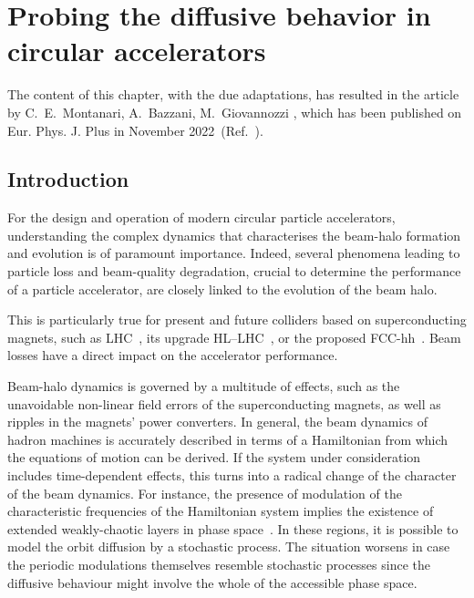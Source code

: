 \chapter{Probing the diffusive behavior in circular accelerators}

\noindent\textsf{The content of this chapter, with the due adaptations, has resulted in the article by C.\ E.\ Montanari, A.\ Bazzani, M.\ Giovannozzi \textit{}, which has been published on Eur. Phys. J. Plus in November 2022~(Ref.~\cite{our_paper9}).}


\section{Introduction}
\label{sec:introduction}


For the design and operation of modern circular particle accelerators, understanding the complex dynamics that characterises the beam-halo formation and evolution is of paramount importance. Indeed, several phenomena leading to particle loss and beam-quality degradation, crucial to determine the performance of a particle accelerator, are closely linked to the evolution of the beam halo. 

This is particularly true for present and future colliders based on superconducting magnets, such as LHC~\cite{LHCDR}, its upgrade HL--LHC~\cite{BejarAlonso:2749422}, or the proposed FCC-hh~\cite{FCC-hhCDR}. Beam losses have a direct impact on the accelerator performance. 

Beam-halo dynamics is governed by a multitude of effects, such as the unavoidable non-linear field errors of the superconducting magnets, as well as ripples in the magnets' power converters. In general, the beam dynamics of hadron machines is accurately described in terms of a Hamiltonian from which the equations of motion can be derived. If the system under consideration includes time-dependent effects, this turns into a radical change of the character of the beam dynamics. For instance, the presence of modulation of the characteristic frequencies of the Hamiltonian system implies the existence of extended weakly-chaotic layers in phase space~\cite{NEISHTADT1991}. In these regions, it is possible to model the orbit diffusion by a stochastic process. The situation worsens in case the periodic modulations themselves resemble stochastic processes since the diffusive behaviour might involve the whole of the accessible phase space.

